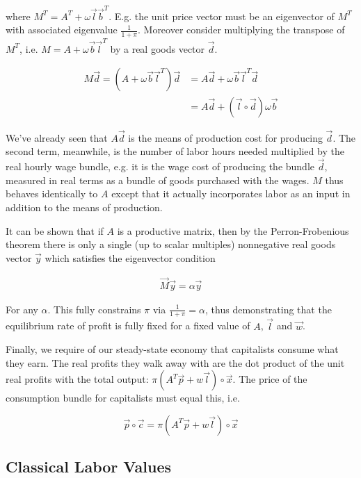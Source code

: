 \documentclass{article}
\theoremstyle{definition}
\begin{document}
where $M^T = A^T + \omega\vec{l}\vec{b}^T$. E.g. the unit price vector must be an eigenvector of $M^T$ with associated eigenvalue $\frac{1}{1+\pi}$. Moreover consider multiplying the transpose of $M^T$, i.e. $M = A+\omega\vec{b}\vec{l}^T$ by a real goods vector $\vec{d}$. 

\begin{align}
    M\vec{d} = (A+\omega\vec{b}\vec{l}^T)\vec{d} &= A\vec{d} + \omega\vec{b}\vec{l}^T \vec{d} \\
                                                   &= A\vec{d} + (\vec{l} \circ \vec{d})\omega\vec{b}
\end{align}

We've already seen that $A\vec{d}$ is the means of production cost for producing $\vec{d}$. The second term, meanwhile, is the number of labor hours needed multiplied by the real hourly wage bundle, e.g. it is the wage cost of producing the bundle $\vec{d}$, measured in real terms as a bundle of goods purchased with the wages. $M$ thus behaves identically to $A$ except that it actually incorporates labor as an input in addition to the means of production. 

It can be shown that if $A$ is a productive matrix, then by the Perron-Frobenious theorem there is only a single (up to scalar multiples) nonnegative real goods vector $\vec{y}$ which satisfies the eigenvector condition

\begin{align}
    \vec{M}\vec{y} = \alpha \vec{y}
\end{align}

For any $\alpha$. This fully constrains $\pi$ via $\frac{1}{1+\pi} = \alpha$, thus demonstrating that the equilibrium rate of profit is fully fixed for a fixed value of $A$, $\vec{l}$ and $\vec{w}$. 

Finally, we require of our steady-state economy that capitalists consume what they earn. The real profits they walk away with are the dot product of the unit real profits with the total output: $\pi(A^T\vec{p}+w\vec{l})\circ \vec{x}$. The price of the consumption bundle for capitalists must equal this, i.e.

\begin{equation}
    \vec{p}\circ \vec{c} = \pi(A^T\vec{p}+w\vec{l})\circ \vec{x}
\end{equation}

\subsection{Classical Labor Values}
\end{document}
